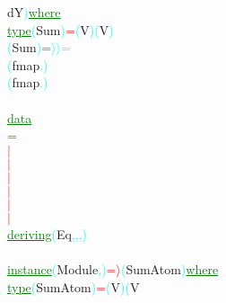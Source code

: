 {\rm{}dY}\textcolor{cyan}{)}\hsspace \textcolor{green}{\underline{where}}\\\hstab \textcolor{green}{\underline{type}}\hsspace \textcolor{cyan}{(}{\rm{}Sum}\textcolor{cyan}{)}\hsspace \textcolor{red}{=}\hsspace \textcolor{cyan}{(}{\rm{}V}\textcolor{cyan}{)}\hsspace \textcolor{cyan}{(}{\rm{}V}\textcolor{cyan}{)}\\\hsspace \textcolor{cyan}{(}{\rm{}Sum}\textcolor{cyan}{)}\hsspace \textcolor{red}{=}\hsspace \textcolor{cyan}{\ensuremath{\rangle}\ensuremath{\rangle}=}\\\hstab \hstab \textcolor{cyan}{(}{\rm{}fmap}\hsspace \hsspace \textcolor{cyan}{.}\textcolor{cyan}{)}\\\hstab \hstab \textcolor{cyan}{(}{\rm{}fmap}\hsspace \textcolor{cyan}{.}\textcolor{cyan}{)}\\\\\textcolor{green}{\underline{data}}\\\hstab \textcolor{red}{=}\\\hstab \textcolor{red}{\ensuremath{|}}\\\hstab \textcolor{red}{\ensuremath{|}}\\\hstab \textcolor{red}{\ensuremath{|}}\\\hstab \textcolor{red}{\ensuremath{|}}\\\hstab \textcolor{red}{\ensuremath{|}}\\\hstab \textcolor{red}{\ensuremath{|}}\\\hstab \textcolor{green}{\underline{deriving}}\hsspace \textcolor{cyan}{(}{\rm{}Eq}\textcolor{cyan}{,}\textcolor{cyan}{,}\textcolor{cyan}{,}\textcolor{cyan}{)}\\\\\textcolor{green}{\underline{instance}}\hsspace \textcolor{cyan}{(}{\rm{}Module}\textcolor{cyan}{,}\textcolor{cyan}{)}\hsspace \textcolor{red}{=\ensuremath{\rangle}}\hsspace \textcolor{cyan}{(}{\rm{}SumAtom}\textcolor{cyan}{)}\hsspace \textcolor{green}{\underline{where}}\\\hstab \textcolor{green}{\underline{type}}\hsspace \textcolor{cyan}{(}{\rm{}SumAtom}\textcolor{cyan}{)}\hsspace \textcolor{red}{=}\hsspace \textcolor{cyan}{(}{\rm{}V}\textcolor{cyan}{)}\hsspace \textcolor{cyan}{(}{\rm{}V}\hsspace 